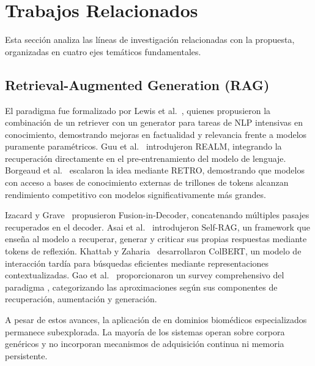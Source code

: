 
\section{Trabajos Relacionados}
\label{sec:related_work}

Esta sección analiza las líneas de investigación relacionadas con la propuesta, organizadas en cuatro ejes temáticos fundamentales.

\subsection{Retrieval-Augmented Generation (RAG)}
\label{subsec:rw_rag}

El paradigma \rag{} fue formalizado por Lewis et al.~\cite{lewis2020retrieval}, quienes propusieron la combinación de un retriever con un generator para tareas de NLP intensivas en conocimiento, demostrando mejoras en factualidad y relevancia frente a modelos puramente paramétricos. Guu et al.~\cite{guu2020realm} introdujeron REALM, integrando la recuperación directamente en el pre-entrenamiento del modelo de lenguaje. Borgeaud et al.~\cite{borgeaud2022improving} escalaron la idea mediante RETRO, demostrando que modelos con acceso a bases de conocimiento externas de trillones de tokens alcanzan rendimiento competitivo con modelos significativamente más grandes.

Izacard y Grave~\cite{izacard2021leveraging} propusieron Fusion-in-Decoder, concatenando múltiples pasajes recuperados en el decoder. Asai et al.~\cite{asai2024selfrag} introdujeron Self-RAG, un framework que enseña al modelo a recuperar, generar y criticar sus propias respuestas mediante tokens de reflexión. Khattab y Zaharia~\cite{khattab2020colbert} desarrollaron ColBERT, un modelo de interacción tardía para búsquedas eficientes mediante representaciones contextualizadas. Gao et al.~\cite{gao2024retrieval} proporcionaron un survey comprehensivo del paradigma \rag{}, categorizando las aproximaciones según sus componentes de recuperación, aumentación y generación.

A pesar de estos avances, la aplicación de \rag{} en dominios biomédicos especializados permanece subexplorada. La mayoría de los sistemas operan sobre corpora genéricos y no incorporan mecanismos de adquisición continua ni memoria persistente.


